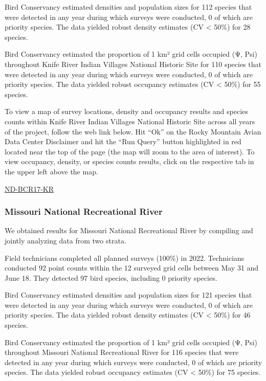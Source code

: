 \documentclass[
  letterpaper,
  DIV=11,
  numbers=noendperiod,
  oneside]{scrreprt}
\begin{document}
Bird Conservancy estimated densities and population sizes for 112
species that were detected in any year during which surveys were
conducted, 0 of which are priority species. The data yielded robust
density estimates (CV \textless{} 50\%) for 28 species.

Bird Conservancy estimated the proportion of 1 km² grid cells occupied
(Ψ, Psi) throughout Knife River Indian Villages National Historic Site
for 110 species that were detected in any year during which surveys were
conducted, 0 of which are priority species. The data yielded robust
occupancy estimates (CV \textless{} 50\%) for 55 species.

To view a map of survey locations, density and occupancy results and
species counts within Knife River Indian Villages National Historic Site
across all years of the project, follow the web link below. Hit ``Ok''
on the Rocky Mountain Avian Data Center Disclaimer and hit the ``Run
Query'' button highlighted in red located near the top of the page (the
map will zoom to the area of interest). To view occupancy, density, or
species counts results, click on the respective tab in the upper left
above the map.

\href{http://www.rmbo.org/new_site/adc/QueryWindow.aspx\#N4IgzgLgTghhCuBbEAuABCAcgEQLQCEBhAJQEYB2XAaWPSoDsBLAMwFM1jGA3VqNASXoATRjHpoAaowA20mAHNWYNJjiMA9vRjS0ACUaR1URgGM0AZUYRWIAL5A=}{ND-BCR17-KR}

\hypertarget{missouri-national-recreational-river}{%
\subsubsection{Missouri National Recreational
River}\label{missouri-national-recreational-river}}

We obtained results for Missouri National Recreational River by
compiling and jointly analyzing data from two strata.

Field technicians completed all planned surveys (100\%) in 2022.
Technicians conducted 92 point counts within the 12 surveyed grid cells
between May 31 and June 18. They detected 97 bird species, including 0
priority species.

Bird Conservancy estimated densities and population sizes for 121
species that were detected in any year during which surveys were
conducted, 0 of which are priority species. The data yielded robust
density estimates (CV \textless{} 50\%) for 46 species.

Bird Conservancy estimated the proportion of 1 km² grid cells occupied
(Ψ, Psi) throughout Missouri National Recreational River for 116 species
that were detected in any year during which surveys were conducted, 0 of
which are priority species. The data yielded robust occupancy estimates
(CV \textless{} 50\%) for 75 species.
\end{document}
